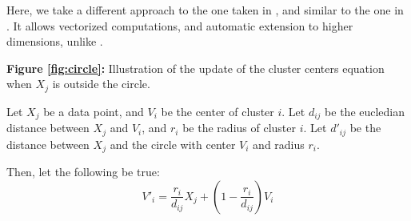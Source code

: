 \documentclass[conference]{IEEEtran}
\begin{document}
Here, we take a different approach to the one taken in \cite{308484}, and similar to the one in \cite{DAVE1992713}. It allows vectorized computations, and
automatic extension to higher dimensions, unlike \cite{308484}.

\begin{center}
\textbf{Figure \ref{fig:circle}:} Illustration of the update of the cluster centers equation when $X_j$ is outside the circle.
\end{center}


Let $X_j$ be a data point, and $V_i$ be the center of cluster $i$. Let $d_{ij}$ be the eucledian distance between $X_j$ and $V_i$,
and $r_i$ be the radius of cluster $i$.
Let $d'_{ij}$ be the distance between $X_j$ and the circle with center $V_i$ and radius $r_i$.

Then, let the following be true:
\begin{equation}
V'_i = \frac{r_i}{d_{ij}}X_j + (1 - \frac{r_i}{d_{ij}})V_i
\end{equation}
\end{document}
